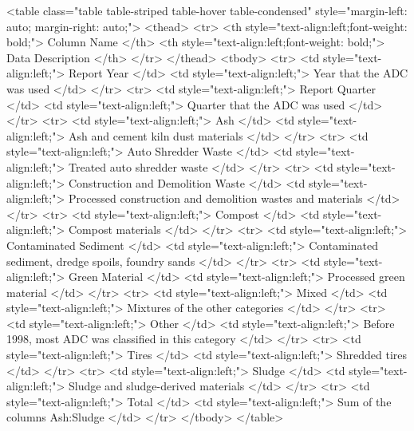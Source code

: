 \documentclass[border=1mm, preview]{standalone}
\begin{document}
<table class="table table-striped table-hover table-condensed" style="margin-left: auto; margin-right: auto;">
 <thead>
  <tr>
   <th style="text-align:left;font-weight: bold;"> Column Name </th>
   <th style="text-align:left;font-weight: bold;"> Data Description </th>
  </tr>
 </thead>
<tbody>
  <tr>
   <td style="text-align:left;"> Report Year </td>
   <td style="text-align:left;"> Year that the ADC was used </td>
  </tr>
  <tr>
   <td style="text-align:left;"> Report Quarter </td>
   <td style="text-align:left;"> Quarter that the ADC was used </td>
  </tr>
  <tr>
   <td style="text-align:left;"> Ash </td>
   <td style="text-align:left;"> Ash and cement kiln dust materials </td>
  </tr>
  <tr>
   <td style="text-align:left;"> Auto Shredder Waste </td>
   <td style="text-align:left;"> Treated auto shredder waste </td>
  </tr>
  <tr>
   <td style="text-align:left;"> Construction and Demolition Waste </td>
   <td style="text-align:left;"> Processed construction and demolition wastes and materials </td>
  </tr>
  <tr>
   <td style="text-align:left;"> Compost </td>
   <td style="text-align:left;"> Compost materials </td>
  </tr>
  <tr>
   <td style="text-align:left;"> Contaminated Sediment </td>
   <td style="text-align:left;"> Contaminated sediment, dredge spoils, foundry sands </td>
  </tr>
  <tr>
   <td style="text-align:left;"> Green Material </td>
   <td style="text-align:left;"> Processed green material </td>
  </tr>
  <tr>
   <td style="text-align:left;"> Mixed </td>
   <td style="text-align:left;"> Mixtures of the other categories </td>
  </tr>
  <tr>
   <td style="text-align:left;"> Other </td>
   <td style="text-align:left;"> Before 1998, most ADC was classified in this category </td>
  </tr>
  <tr>
   <td style="text-align:left;"> Tires </td>
   <td style="text-align:left;"> Shredded tires </td>
  </tr>
  <tr>
   <td style="text-align:left;"> Sludge </td>
   <td style="text-align:left;"> Sludge and sludge-derived materials </td>
  </tr>
  <tr>
   <td style="text-align:left;"> Total </td>
   <td style="text-align:left;"> Sum of the columns Ash:Sludge </td>
  </tr>
</tbody>
</table>
\end{document}
